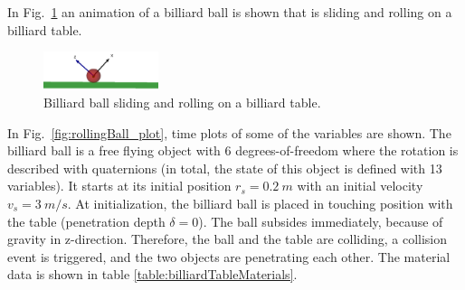 In Fig.~\ref{fig:rollingBall} an animation of a billiard ball is shown that is sliding and rolling
on a billiard table. 
%
\begin{figure}[bt]
	\centering
	\includegraphics[width=0.3\textwidth]{figures/rollingBall.png}
	\caption{Billiard ball sliding and rolling on a billiard table.}
	\label{fig:rollingBall}
\end{figure}
%
In Fig.~\ref{fig:rollingBall_plot}, time plots of some of the variables
are shown. The billiard ball is a free flying object with 6 degrees-of-freedom where the rotation is
described with quaternions (in total, the state of this object is defined with 13 variables). 
It starts at its initial position $r_s = 0.2~m$ with an initial velocity $v_s = 3~m/s$. At initialization, the billiard ball is placed in touching position with the table (penetration depth $\delta = 0$). The ball subsides immediately, because of gravity in z-direction. Therefore, the ball and the table are colliding, a collision event is triggered, and the two objects are penetrating each other. The material data is shown in table \ref{table:billiardTableMaterials}.

